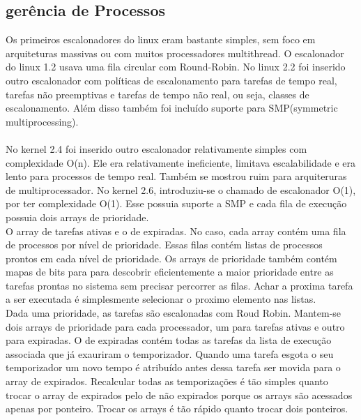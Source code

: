 \documentclass[conference]{IEEEtran}
\begin{document}
\subsection{gerência de Processos}\label{sec:LinuxPROC}

Os primeiros escalonadores do linux eram bastante simples, sem foco em arquiteturas massivas ou com muitos processadores multithread. O escalonador do linux 1.2 usava uma fila circular com Round-Robin. No linux 2.2 foi inserido outro escalonador com políticas de escalonamento para tarefas de tempo real, tarefas não preemptivas e tarefas de tempo não real, ou seja,  classes de escalonamento. Além disso também foi incluído suporte para SMP(symmetric multiprocessing)\cite{LinuxSchedulerIBM}.\\
\\
 No kernel 2.4 foi  inserido outro escalonador relativamente simples com complexidade O(n). Ele era relativamente ineficiente, limitava escalabilidade e era lento para processos de tempo real. Também se mostrou ruim para arquiteruras de multiprocessador. No kernel 2.6, introduziu-se o chamado de escalonador O(1), por ter complexidade O(1). Esse possuia suporte a SMP e cada fila de execução possuia dois arrays de prioridade.\\

 O array de tarefas ativas e o de expiradas. No caso, cada array contém uma fila de processos por nível de prioridade. Essas filas contém listas de processos prontos em cada nível de prioridade. Os  arrays de prioridade também contém mapas de bits para para descobrir eficientemente a maior prioridade entre as tarefas prontas no sistema sem precisar percorrer as filas. Achar a proxima tarefa a ser executada é simplesmente selecionar o proximo elemento nas listas.\\

 Dada uma prioridade, as tarefas são escalonadas com Roud Robin. Mantem-se dois arrays de prioridade para cada processador, um para tarefas ativas e outro para expiradas. O de expiradas contém todas as tarefas da lista de execução associada que já exauriram o temporizador. Quando uma tarefa esgota o seu temporizador um novo tempo é atribuído antes dessa tarefa ser movida para o array de expirados. Recalcular todas as temporizações é tão simples quanto trocar o array de expirados pelo de não expirados porque os arrays são acessados apenas por ponteiro. Trocar os arrays é tão rápido quanto trocar dois ponteiros\cite{LinuxSchedulerMIT}.\\
\end{document}
